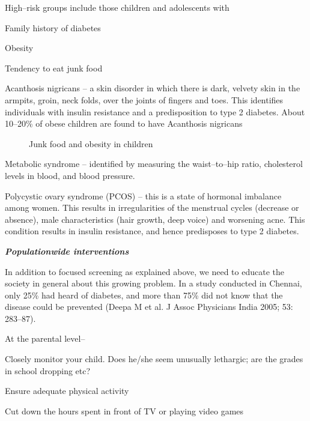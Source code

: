 High–risk groups include those children and adolescents with

\item Family history of diabetes

 \item Obesity

 \item Tendency to eat junk food

 \item 
 Acanthosis nigricans – a skin disorder in which there is dark, velvety skin in the armpits, groin, neck folds, over the joints of fingers and toes. This identifies individuals with insulin resistance and a predisposition to type 2 diabetes. About 10–20\% of obese children are found to have Acanthosis nigricans

\begin{figure}\caption{Junk food and obesity in children}\end{figure}

 \item Metabolic syndrome – identified by measuring the waist–to–hip ratio, cholesterol levels in blood, and blood pressure.

 \item Polycystic ovary syndrome (PCOS) – this is a state of hormonal imbalance among women. This results in irregularities of the menstrual cycles (decrease or absence), male characteristics (hair growth, deep voice) and worsening acne. This condition results in insulin resistance, and hence predisposes to type 2 diabetes.

\textbf{\textit{Populationwide interventions}}

In addition to focused screening as explained above, we need to educate the society in general about this growing problem. In a study conducted in Chennai, only 25\% had heard of diabetes, and more than 75\% did not know that the disease could be prevented (Deepa M et al. J Assoc Physicians India 2005; 53: 283–87).

At the parental level–

\item Closely monitor your child. Does he/she seem unusually lethargic; are the grades in school dropping etc?

 \item Ensure adequate physical activity

 \item Cut down the hours spent in front of TV or playing video games

